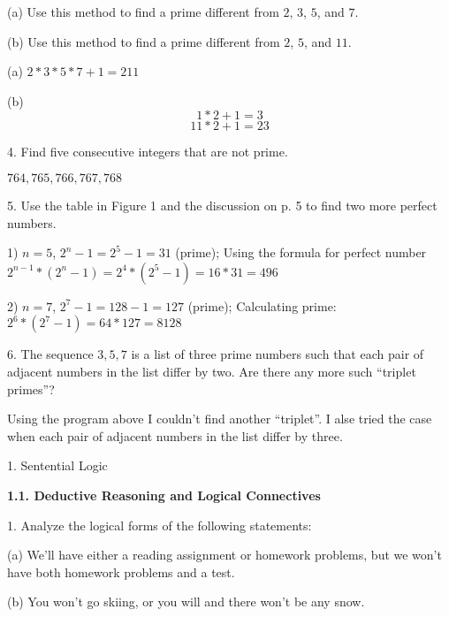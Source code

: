 \documentclass{article}
\begin{document}
(a) Use this method to find a prime different from $2$, $3$, $5$, and $7$.

(b) Use this method to find a prime different from $2$, $5$, and $11$.
\vspace{20pt}

(a) $2*3*5*7+1 = 211$
\vspace{10pt}

(b) $$1*2+1=3$$
    $$11*2+1=23$$
\vspace{40pt}

4. Find five consecutive integers that are not prime.
\vspace{20pt}

$764, 765, 766, 767, 768$
\vspace{40pt}

5. Use the table in Figure 1 and the discussion on p. 5 to find two more perfect
numbers.
\vspace{20pt}

1) $n = 5$, $2^n-1 = 2^5-1=31$ (prime); Using the formula for perfect number $2^{n-1}*(2^n-1) = 2^4*(2^5-1) = 16*31 = 496$
\vspace{10pt}

2) $n = 7$, $2^7-1= 128 - 1 = 127$ (prime); Calculating prime: $2^6*(2^7-1) = 64*127 = 8128$
\vspace{40pt}

6. The sequence $3, 5, 7$ is a list of three prime numbers such that each pair of
adjacent numbers in the list differ by two. Are there any more such “triplet
primes”?
\vspace{20pt}



Using the program above I couldn't find another “triplet”. I alse tried the case when each pair of adjacent numbers in the list differ by three.
\pagebreak

\centerline{\sc \large 1. Sentential Logic}
\vspace{50pt}

\textbf{1.1. Deductive Reasoning and Logical Connectives}
\vspace{40pt}

1. Analyze the logical forms of the following statements:

\hspace{12pt}(a) We'll have either a reading assignment or homework problems, but we
won't have both homework problems and a test.

\hspace{12pt}(b) You won't go skiing, or you will and there won't be any snow.
\end{document}
